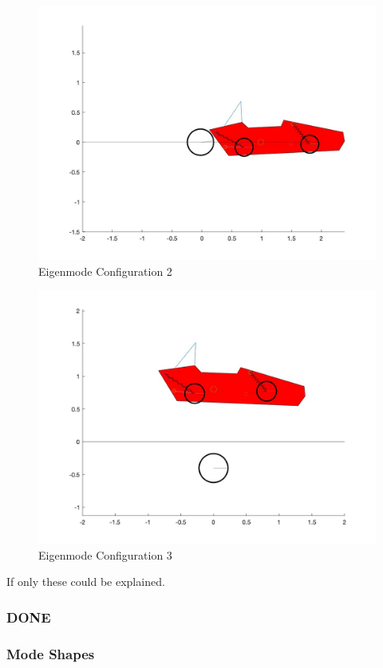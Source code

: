 \begin{figure}[ht]
    \centering
    \includegraphics[scale=0.235]{images/mode2.jpg}
    \caption{Eigenmode Configuration 2}
    \label{fig:mode_2}
\end{figure}

\begin{figure}[ht]
    \centering
    \includegraphics[scale=0.235]{images/mode3.jpg}
    \caption{Eigenmode Configuration 3}
    \label{fig:mode_3}
\end{figure}

If only these could be explained.

\subsubsection{DONE}
\subsubsection{Mode Shapes}
